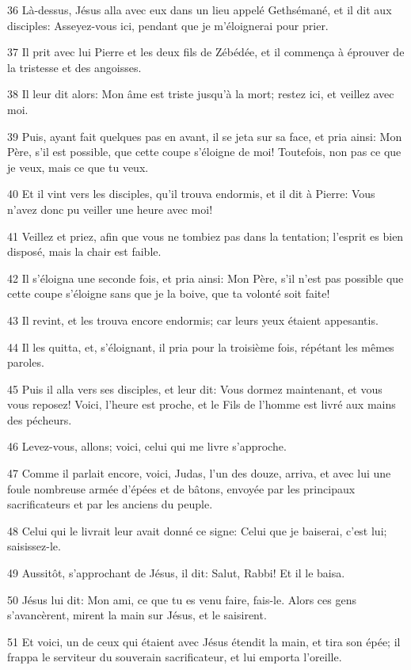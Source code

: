 \par 36 Là-dessus, Jésus alla avec eux dans un lieu appelé Gethsémané, et il dit aux disciples: Asseyez-vous ici, pendant que je m'éloignerai pour prier.
\par 37 Il prit avec lui Pierre et les deux fils de Zébédée, et il commença à éprouver de la tristesse et des angoisses.
\par 38 Il leur dit alors: Mon âme est triste jusqu'à la mort; restez ici, et veillez avec moi.
\par 39 Puis, ayant fait quelques pas en avant, il se jeta sur sa face, et pria ainsi: Mon Père, s'il est possible, que cette coupe s'éloigne de moi! Toutefois, non pas ce que je veux, mais ce que tu veux.
\par 40 Et il vint vers les disciples, qu'il trouva endormis, et il dit à Pierre: Vous n'avez donc pu veiller une heure avec moi!
\par 41 Veillez et priez, afin que vous ne tombiez pas dans la tentation; l'esprit es bien disposé, mais la chair est faible.
\par 42 Il s'éloigna une seconde fois, et pria ainsi: Mon Père, s'il n'est pas possible que cette coupe s'éloigne sans que je la boive, que ta volonté soit faite!
\par 43 Il revint, et les trouva encore endormis; car leurs yeux étaient appesantis.
\par 44 Il les quitta, et, s'éloignant, il pria pour la troisième fois, répétant les mêmes paroles.
\par 45 Puis il alla vers ses disciples, et leur dit: Vous dormez maintenant, et vous vous reposez! Voici, l'heure est proche, et le Fils de l'homme est livré aux mains des pécheurs.
\par 46 Levez-vous, allons; voici, celui qui me livre s'approche.
\par 47 Comme il parlait encore, voici, Judas, l'un des douze, arriva, et avec lui une foule nombreuse armée d'épées et de bâtons, envoyée par les principaux sacrificateurs et par les anciens du peuple.
\par 48 Celui qui le livrait leur avait donné ce signe: Celui que je baiserai, c'est lui; saisissez-le.
\par 49 Aussitôt, s'approchant de Jésus, il dit: Salut, Rabbi! Et il le baisa.
\par 50 Jésus lui dit: Mon ami, ce que tu es venu faire, fais-le. Alors ces gens s'avancèrent, mirent la main sur Jésus, et le saisirent.
\par 51 Et voici, un de ceux qui étaient avec Jésus étendit la main, et tira son épée; il frappa le serviteur du souverain sacrificateur, et lui emporta l'oreille.
